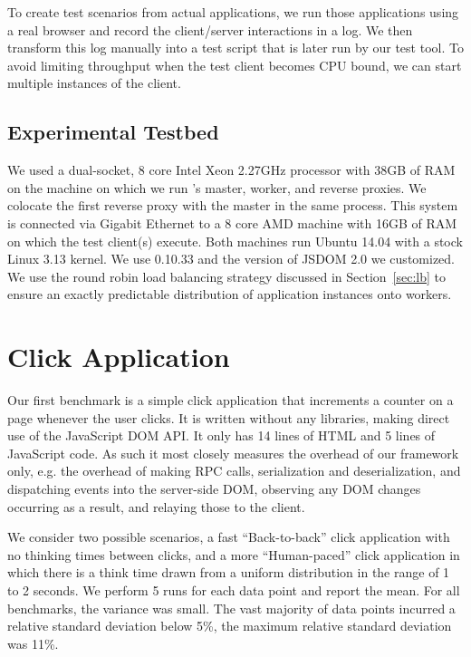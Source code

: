 To create test scenarios from actual applications,
we run those applications using a real browser and record the client/server interactions
in a log.  We then transform this log manually into a test script that is later run 
by our test tool.  To avoid limiting throughput when the test client becomes CPU bound,
we can start multiple instances of the client.



\subsection{Experimental Testbed}
We used a dual-socket, 8 core Intel Xeon 2.27GHz processor with 38GB of RAM on
the machine on which we run \cbtwo{}'s master, worker, and reverse proxies.
We colocate the first reverse proxy with the master in the same process. This
system is connected via Gigabit Ethernet to a 8 core AMD machine with 16GB of
RAM on which the test client(s) execute. Both machines run  Ubuntu 14.04 with
a stock Linux 3.13 kernel.  We use \nodejs{} 0.10.33 and the version of JSDOM
2.0 we customized.  We use the round robin load balancing strategy discussed in
Section~\ref{sec:lb} to ensure an exactly predictable distribution
of application instances onto workers.

%
%

\section{Click Application}
Our first benchmark is a simple click application that increments a counter on a page
whenever the user clicks.  It is written without any libraries, making direct use of
the JavaScript DOM API.  It only has 14 lines of HTML and 5 lines of JavaScript code.
As such it most closely measures the overhead of our
framework only, e.g. the overhead of making RPC calls, serialization and deserialization,
and dispatching events into the server-side DOM, observing any DOM changes occurring as
a result, and relaying those to the client.

We consider two possible scenarios, a fast ``Back-to-back'' click application 
with no thinking times between clicks, and a more ``Human-paced'' click application
in which there is a think time drawn from a uniform distribution in the range of
1 to 2 seconds.  We perform 5 runs for each data point and report the mean.
For all benchmarks, the variance was small. The vast majority of data points incurred
a relative standard deviation below 5\%, the maximum relative standard deviation was 11\%.

